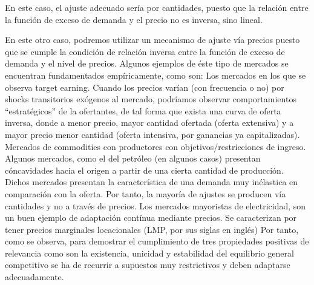 \documentclass[10pt,a4paper]{article}
\begin{document}
En este caso, el ajuste adecuado sería por cantidades, puesto que la relación entre la función de exceso de demanda y el precio no es inversa, sino lineal. 
 
En este otro caso, podremos utilizar un mecanismo de ajuste vía precios puesto que se cumple la condición de relación inversa entre la función de exceso de demanda y el nivel de precios. 
Algunos ejemplos de éste tipo de mercados se encuentran fundamentados empíricamente, como son:
	Los mercados en los que se observa target earning. Cuando los precios varían (con frecuencia o no) por shocks transitorios exógenos al mercado, podríamos observar comportamientos “estratégicos” de la ofertantes, de tal forma que exista una curva de oferta inversa, donde a menor precio, mayor cantidad ofertada (oferta extensiva) y a mayor precio menor cantidad (oferta intensiva, por ganancias ya capitalizadas).  
	Mercados de commodities con productores con objetivos/restricciones de ingreso.  Algunos mercados, como el del petróleo (en algunos casos) presentan cóncavidades hacia el origen a partir de una cierta cantidad de producción. Dichos mercados presentan la característica de una demanda muy inélastica en comparación con la oferta. Por tanto, la mayoría de ajustes se producen vía cantidades y no a través de precios. 
	Los mercados mayoristas de electricidad, son un buen ejemplo de adaptación contínua mediante precios. Se caracterizan por tener precios marginales locacionales (LMP, por sus siglas en inglés)    
Por tanto, como se observa, para demostrar el cumplimiento de tres propiedades positivas de relevancia como son la existencia, unicidad y estabilidad del equilibrio general competitivo se ha de recurrir a supuestos muy restrictivos y deben adaptarse adecuadamente. 
\end{document}
